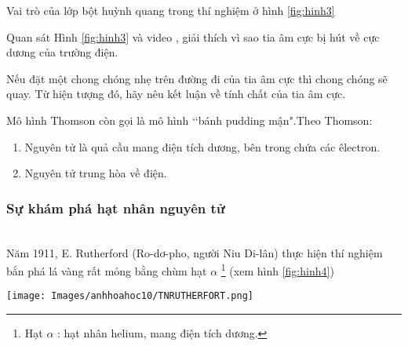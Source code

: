\begin{hoivadap}
	\begin{cauhoi}
		Vai trò của lớp bột huỳnh quang trong thí nghiệm ở hình \ref{fig:hinh3}
	\end{cauhoi}
\end{hoivadap}

\begin{hoivadap}
	\begin{cauhoi}
		Quan sát Hình \ref{fig:hinh3} và video , giải thích vì sao tia âm cực bị hút về cực dương của trường điện.
	\end{cauhoi}
\end{hoivadap}
%
\begin{hoivadap}
	\begin{cauhoi}
		Nếu đặt một chong chóng nhẹ trên đường đi của tia âm cực thì chong chóng sẽ quay. Từ hiện tượng đó, hãy nêu kết luận về tính chất của tia âm cực.
	\end{cauhoi}
\end{hoivadap}

\begin{Bancobiet}
	Mô hình Thomson còn gọi là mô hình \lq\lq bánh pudding mận".Theo Thomson:
	\begin{enumerate}
		\item Nguyên tử là quả cầu mang điện tích dương, bên trong chứa các êlectron.
		\item Nguyên tử trung hòa về điện.
	\end{enumerate}
\end{Bancobiet}
%
%
\subsubsection{Sự khám phá hạt nhân nguyên tử}
\\
Năm 1911, E. Rutherford (Ro-dơ-pho, người Niu Di-lân) thực hiện thí nghiệm bắn phá lá vàng rất mỏng bằng chùm hạt $ \alpha $ \footnote{Hạt $\alpha$ : hạt nhân helium, mang điện tích dương.} (xem hình \ref{fig:hinh4})
\begin{center}
	\texttt{[image: Images/anhhoahoc10/TNRUTHERFORT.png]}\\
	\label{fig:hinh4}
\end{center}

